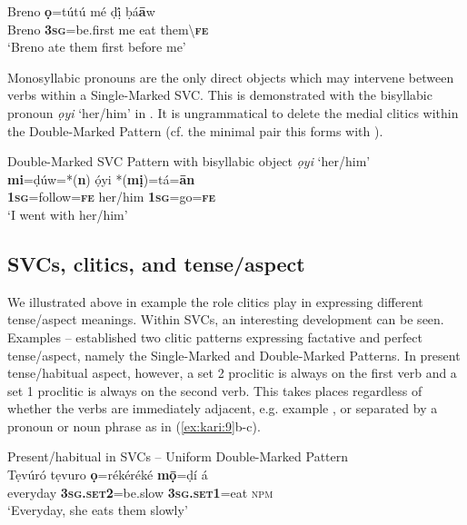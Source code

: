 \documentclass[output=paper]{langsci/langscibook}
\begin{document}
\ea
\gll  Breno   \textbf{ọ}=tútú     mé   ḍị́   ḅá\textbf{ā}w\\
     Breno  \textbf{\textsc{3sg}}=be.first  me  eat  them{\textbackslash}\textbf{\textsc{fe}}\\
\glt ‘Breno ate them first before me’
\z

Monosyllabic pronouns are the only direct objects which may intervene between verbs within a Single-Marked SVC. This is demonstrated with the bisyllabic pronoun \textit{ọyi} ‘her/him’ in . It is ungrammatical to delete the medial clitics within the Double-Marked Pattern (cf. the minimal pair this forms with ). 

\ea
{Double-Marked SVC Pattern with bisyllabic object \textit{ọyi} ‘her/him’}\\
\gll  \textbf{mi}=ḍúw=*(\textbf{n})     ọ́yi     *(\textbf{mị})=tá=\textbf{ān}\\
     \textbf{1\textsc{sg}}=follow=\textbf{\textsc{fe}}   her/him   \textbf{1\textsc{sg}}=go=\textbf{\textsc{fe}}\\
\glt ‘I went with her/him’ \citep[201]{Kari2004}
\z

\subsection{SVCs, clitics, and tense/aspect}

We illustrated above in example  the role clitics play in expressing different tense/aspect meanings. Within SVCs, an interesting development can be seen. Examples -- established two clitic patterns expressing factative and perfect tense/aspect, namely the Single-Marked and Double-Marked Patterns. In present tense/habitual aspect, however, a set 2 proclitic is always on the first verb and a set 1 proclitic is always on the second verb. This takes places regardless of whether the verbs are immediately adjacent, e.g. example , or separated by a pronoun or noun phrase as in (\ref{ex:kari:9}b-c). 

\ea
{Present/habitual in SVCs – Uniform Double-Marked Pattern}\\
\gll   Tẹvúró tẹvuro  \textbf{ọ}=rékéréké       \textbf{mọ̄}=ḍí       á\\ 
       everyday     \textbf{\textsc{3sg.set2}}=be.slow  \textbf{\textsc{3sg.set1}}=eat  \textsc{npm}\\
\glt ‘Everyday, she eats them slowly’ 
\z
\end{document}
